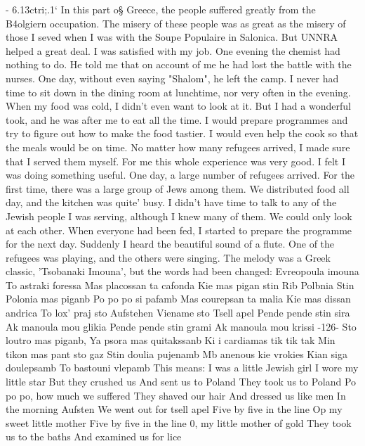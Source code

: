 
- 6.13ctri;.1‘ 
In this part o§ Greece, the people suffered greatly from the B4olgiern occupation.
The misery of these people was as great as the misery of those I seved when I was with 
the Soupe Populaire in Salonica.
But UNNRA helped a great deal.
I was satisfied with 
my job.
One evening the chemist had nothing to do.
He told me that on account of me 
he had lost the battle with the nurses.
One day, without even saying "Shalom", he 
left the camp.
I never had time to sit down in the dining room at lunchtime, nor very often in 
the evening.
When my food was cold, I didn't even want to look at it.
But I had a 
wonderful took, and he was after me to eat all the time.
I would prepare programmes 
and try to figure out how to make the food tastier.
I would even help the cook so 
that the meals would be on time.
No matter how many refugees arrived, I made sure 
that I served them myself.
For me this whole experience was very good.
I felt I 
was doing something useful.
One day, a large number of refugees arrived.
For the first time, there was a 
large group of Jews among them.
We distributed food all day, and the kitchen was quite' 
busy.
I didn't have time to talk to any of the Jewish people I was serving, although 
I knew many of them.
We could only look at each other.
When everyone had been fed, 
I started to prepare the programme for the next day.
Suddenly I heard the beautiful 
sound of a flute.
One of the refugees was playing, and the others were singing.
The 
melody was a Greek classic, 'Tsobanaki Imouna', but the words had been changed: 
Evreopoula imouna 
To astraki foressa 
Mas placossan ta cafonda 
Kie mas pigan stin Rib Polbnia 
Stin Polonia mas piganb 
Po po po si pafamb 
Mas courepsan ta malia 
Kie mas dissan andrica 
To lox' praj sto Aufstehen 
Viename sto Tsell apel 
Pende pende stin sira 
Ak manoula mou glikia 
Pende pende stin grami 
Ak manoula mou krissi 
-126- 
Sto loutro mas piganb, 
Ya psora mas quitakssanb 
Ki i cardiamas tik tik tak 
Min tikon mas pant sto gaz 
Stin doulia pujenamb 
Mb anenous kie vrokies 
Kian siga doulepsamb 
To bastouni vlepamb 
This means: 
I was a little Jewish girl 
I wore my little star 
But they crushed us 
And sent us to Poland 
They took us to Poland 
Po po po, how much we suffered 
They shaved our hair 
And dressed us like men 
In the morning Aufsten 
We went out for tsell apel 
Five by five in the line 
Op 
my sweet little mother 
Five by five in the line 
0, my little mother of gold 
They took us to the baths 
And examined us for lice 
